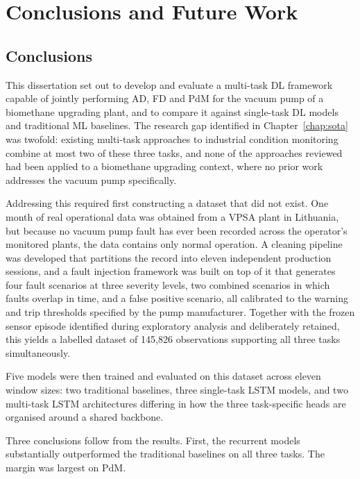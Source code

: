 
\chapter{Conclusions and Future Work} \label{chap:conclusions}

\section{Conclusions} \label{sec:conclusions}

This dissertation set out to develop and evaluate a multi-task DL framework capable of jointly
performing AD, FD and PdM for the vacuum pump of a
biomethane upgrading plant, and to compare it against single-task DL models and traditional
ML baselines. The research gap identified in Chapter~\ref{chap:sota} was twofold: existing
multi-task approaches to industrial condition monitoring combine at most two of these three tasks, and
none of the approaches reviewed had been applied to a biomethane upgrading context, where no prior work
addresses the vacuum pump specifically.

Addressing this required first constructing a dataset that did not exist. One month of real operational
data was obtained from a VPSA plant in Lithuania, but because no vacuum pump fault has ever been recorded
across the operator's monitored plants, the data contains only normal operation. A cleaning pipeline was
developed that partitions the record into eleven independent production sessions, and a fault injection
framework was built on top of it that generates four fault scenarios at three severity levels, two
combined scenarios in which faults overlap in time, and a false positive scenario, all calibrated to the
warning and trip thresholds specified by the pump manufacturer. Together with the frozen sensor episode
identified during exploratory analysis and deliberately retained, this yields a labelled dataset of
145{,}826 observations supporting all three tasks simultaneously.

Five models were then trained and evaluated on this dataset across eleven window sizes: two traditional
baselines, three single-task LSTM models, and two multi-task LSTM architectures differing in how the three
task-specific heads are organised around a shared backbone.

Three conclusions follow from the results. First, the recurrent models substantially outperformed the traditional baselines on all three tasks. The
margin was largest on PdM.

